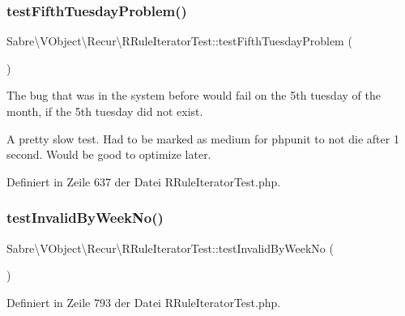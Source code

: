 \subsubsection{\texorpdfstring{test\+Fifth\+Tuesday\+Problem()}{testFifthTuesdayProblem()}}
{\footnotesize\ttfamily Sabre\textbackslash{}\+V\+Object\textbackslash{}\+Recur\textbackslash{}\+R\+Rule\+Iterator\+Test\+::test\+Fifth\+Tuesday\+Problem (\begin{DoxyParamCaption}{ }\end{DoxyParamCaption})}

The bug that was in the system before would fail on the 5th tuesday of the month, if the 5th tuesday did not exist.

A pretty slow test. Had to be marked as \textquotesingle{}medium\textquotesingle{} for phpunit to not die after 1 second. Would be good to optimize later.

Definiert in Zeile 637 der Datei R\+Rule\+Iterator\+Test.\+php.

\mbox{\label{class_sabre_1_1_v_object_1_1_recur_1_1_r_rule_iterator_test_aa813d8c04ec6b593a1995f040d0a082c}} 
\subsubsection{\texorpdfstring{test\+Invalid\+By\+Week\+No()}{testInvalidByWeekNo()}}
{\footnotesize\ttfamily Sabre\textbackslash{}\+V\+Object\textbackslash{}\+Recur\textbackslash{}\+R\+Rule\+Iterator\+Test\+::test\+Invalid\+By\+Week\+No (\begin{DoxyParamCaption}{ }\end{DoxyParamCaption})}



Definiert in Zeile 793 der Datei R\+Rule\+Iterator\+Test.\+php.

\mbox{\label{class_sabre_1_1_v_object_1_1_recur_1_1_r_rule_iterator_test_ac9737326054573941e5663a16640eb93}} 
